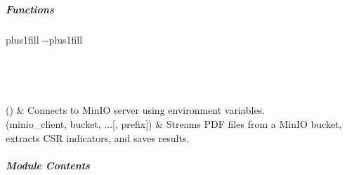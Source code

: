 \documentclass[letterpaper,10pt,english]{sphinxmanual}
\begin{document}
\subparagraph{Functions}
\label{\detokenize{autoapi/modules/input/minio_streaming_extractor/index:functions}}

\begin{savenotes}
\sphinxatlongtablestart
\sphinxthistablewithglobalstyle
\sphinxthistablewithnovlinesstyle
\makeatletter
  \LTleft \@totalleftmargin plus1fill
  \LTright\dimexpr\columnwidth-\@totalleftmargin-\linewidth\relax plus1fill
\makeatother
\begin{longtable}{}
\sphinxtoprule
\endfirsthead

\\
\sphinxtoprule
\endhead

\sphinxbottomrule
{}\\
\endfoot

\endlastfoot
\sphinxtableatstartofbodyhook

\sphinxAtStartPar
{\hyperref[\detokenize{autoapi/modules/input/minio_streaming_extractor/index:modules.input.minio_streaming_extractor.connect_to_minio_from_env}]{}}()
&
\sphinxAtStartPar
Connects to MinIO server using environment variables.
\\
\sphinxhline
\sphinxAtStartPar
{\hyperref[\detokenize{autoapi/modules/input/minio_streaming_extractor/index:modules.input.minio_streaming_extractor.stream_pdf_and_extract}]{}}(minio\_client, bucket, ...{[}, prefix{]})
&
\sphinxAtStartPar
Streams PDF files from a MinIO bucket, extracts CSR indicators, and saves results.
\\
\sphinxbottomrule
\end{longtable}
\sphinxtableafterendhook
\sphinxatlongtableend
\end{savenotes}


\subparagraph{Module Contents}
\label{\detokenize{autoapi/modules/input/minio_streaming_extractor/index:module-contents}}

\begin{fulllineitems}
\label{\detokenize{autoapi/modules/input/minio_streaming_extractor/index:modules.input.minio_streaming_extractor.logger}}
\pysigstartsignatures
\pysigline
{}
\pysigstopsignatures
\end{fulllineitems}
\end{document}
